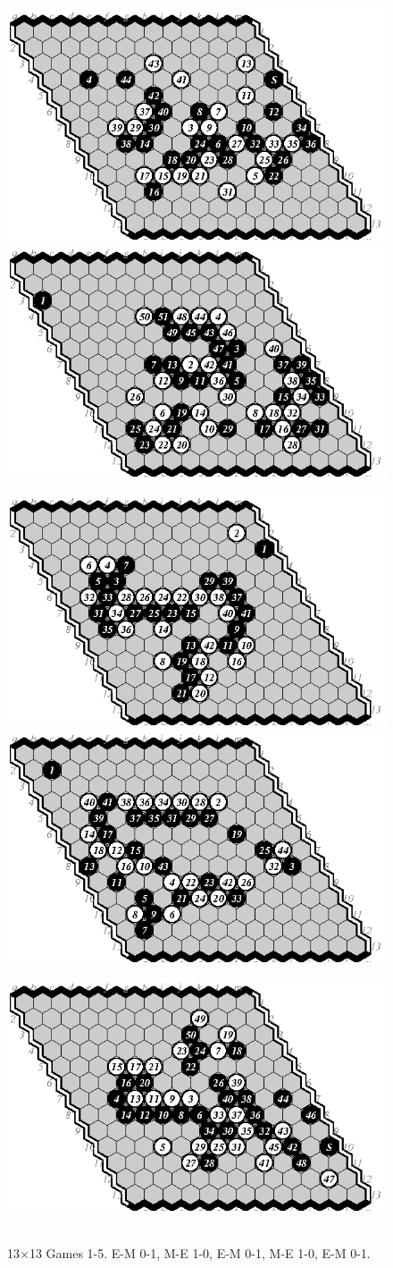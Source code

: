 \documentclass{IOS-Book-Article}
\begin{document}
\begin{figure}
\noindent\includegraphics[width=.58\columnwidth]{pix/01-e-m}\hspace*{-.14\columnwidth}\includegraphics[width=.58\columnwidth]{pix/02-m-e}
\vspace*{.2cm}

\noindent\includegraphics[width=.58\columnwidth]{pix/03-e-m}\hspace*{-.14\columnwidth}\includegraphics[width=.58\columnwidth]{pix/04-m-e}
\vspace*{.2cm}

\noindent\hfill\includegraphics[width=.58\columnwidth]{pix/05-e-m}\hfill\ 
\caption{13$\times$13 Games 1-5. E-M 0-1, M-E 1-0, E-M 0-1, M-E 1-0, E-M 0-1.}
\end{figure}
\end{document}
